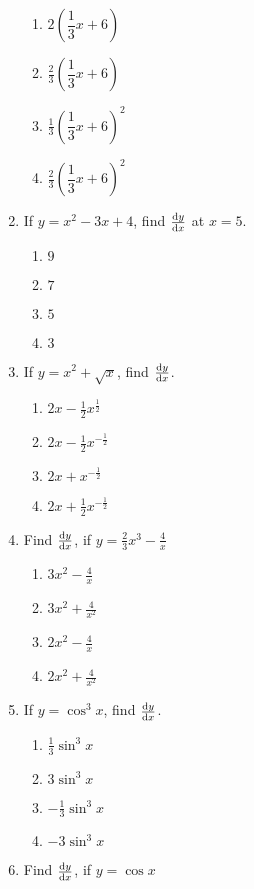 \begin{multicols}{2}
\begin{enumerate}[label={\arabic*.}]
	\begin{enumerate}[label={\Alph*.}]
	\item \(2{\left(\dfrac{1}{3}x + 6\right)}\)
	\item \(\frac{2}{3}{\left(\dfrac{1}{3}x + 6\right)}\)
	\item \(\frac{1}{3}{\left(\dfrac{1}{3}x + 6\right)}^{2}\)
	\item \(\frac{2}{3}{\left(\dfrac{1}{3}x + 6\right)}^{2}\)
	\end{enumerate}
\item If \(y = {x}^{2}-3{x}+4\), find \(\dv{y}{x}\) at \(x = 5\).
	\begin{enumerate}[label={\Alph*.}]
	\item \(9\)
	\item \(7\)
	\item \(5\)
	\item \(3\)
	\end{enumerate}
\item If  \(y = {x}^{2}+\sqrt{x}\), find \(\dv{y}{x}\).
	\begin{enumerate}[label={\Alph*.}]
	\item \(2x-\frac{1}{2}x^{\frac{1}{2}}\)
	\item \(2x-\frac{1}{2}x^{-{\frac{1}{2}}}\)
	\item \(2x+x^{-{\frac{1}{2}}}\)
	\item \(2x+\frac{1}{2}x^{-{\frac{1}{2}}}\)
	\end{enumerate}
\item Find \(\dv{y}{x}\), if \(y = \frac{2}{3}{x}^{3}-\frac{4}{x}\)
	\begin{enumerate}[label={\Alph*.}]
	\item \({3}{x}^{2}-\frac{4}{x}\)
	\item \({3}{x}^{2}+\frac{4}{x^{2}}\)
	\item \({2}{x}^{2}-\frac{4}{x}\)
	\item \({2}{x}^{2}+\frac{4}{x^{2}}\)
	\end{enumerate}
\item If \(y = \cos^{3}{x}\), find \(\dv{y}{x}\).
	\begin{enumerate}[label={\Alph*.}]
	\item \(\frac{1}{3}\sin^{3}{x}\)
	\item \({3}\sin^{3}{x}\)
	\item \(-{\frac{1}{3}\sin^{3}{x}}\)
	\item \(-3\sin^{3}{x}\)
	\end{enumerate}
\item Find \(\dv{y}{x}\), if \(y = \cos{x}\)

\end{enumerate}
\end{multicols}
